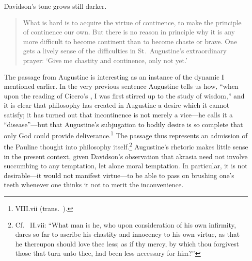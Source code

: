 \documentclass[11pt,letterpaper,oneside]{amsart}
\begin{document}


Davidson's tone grows still darker.\begin{quote}What is hard is to acquire the virtue of continence, to make the principle of continence our own. But there is no reason in principle why it is any more difficult to become continent than to become chaste or brave. One gets a lively sense of the difficulties in St.\ Augustine's extraordinary prayer: `Give me chastity and continence, only not yet.'\end{quote} The passage from Augustine is interesting as an instance of the dynamic I mentioned earlier. In the very previous sentence Augustine tells us how, ``when upon the reading of Cicero's , I was first stirred up to the study of wisdom,'' and it is clear that philosophy has created in Augustine a desire which it cannot satisfy; it has turned out that incontinence is not merely a vice---he calls it a ``disease''---but that Augustine's subjugation to bodily desire is so complete that only God could provide deliverance.\footnote{ VIII.vii (trans.\ ).} The passage thus represents an admission of the Pauline thought into philosophy itself.\footnote{Cf.\  II.vii: ``What man is he, who upon consideration of his own infirmity, dares so far to ascribe his chastity and innocency to his own virtue, as that he thereupon should love thee less; as if thy mercy, by which thou forgivest those that turn unto thee, had been less necessary for him?''} Augustine's rhetoric makes little sense in the present context, given Davidson's observation that akrasia need not involve succumbing to any temptation, let alone moral temptation. In particular, it is not desirable---it would not manifest virtue---to be able to pass on brushing one's teeth whenever one thinks it not to merit the inconvenience.%





\end{document}

